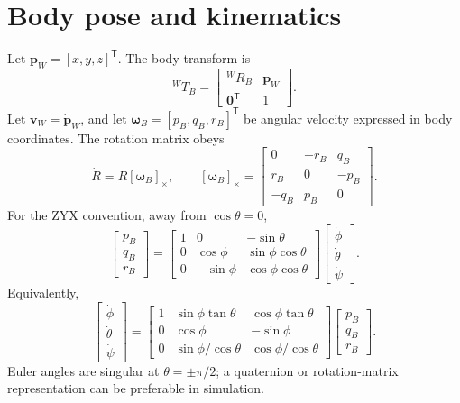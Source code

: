 \documentclass[11pt,a4paper]{article}
\newcommand{\skew}[1]{[#1]_\times}
\begin{document}
\section{Body pose and kinematics}
Let \(\mathbf p_W=[x,y,z]^{\mathsf T}\). The body transform is
\[
{}^WT_B=\begin{bmatrix}{}^WR_B&\mathbf p_W\\\mathbf0^{\mathsf T}&1\end{bmatrix}.
\]
Let \(\mathbf v_W=\dot{\mathbf p}_W\), and let \(\boldsymbol\omega_B=[p_B,q_B,r_B]^{\mathsf T}\) be angular velocity expressed in body coordinates. The rotation matrix obeys
\[
\dot R=R\skew{\boldsymbol\omega_B},\qquad
\skew{\boldsymbol\omega_B}=
\begin{bmatrix}0&-r_B&q_B\\r_B&0&-p_B\\-q_B&p_B&0\end{bmatrix}.
\]
For the ZYX convention, away from \(\cos\theta=0\),
\[
\begin{bmatrix}p_B\\q_B\\r_B\end{bmatrix}=
\begin{bmatrix}
1&0&-\sin\theta\\
0&\cos\phi&\sin\phi\cos\theta\\
0&-\sin\phi&\cos\phi\cos\theta
\end{bmatrix}
\begin{bmatrix}\dot\phi\\\dot\theta\\\dot\psi\end{bmatrix}.
\]
Equivalently,
\[
\begin{bmatrix}\dot\phi\\\dot\theta\\\dot\psi\end{bmatrix}=
\begin{bmatrix}
1&\sin\phi\tan\theta&\cos\phi\tan\theta\\
0&\cos\phi&-\sin\phi\\
0&\sin\phi/\cos\theta&\cos\phi/\cos\theta
\end{bmatrix}
\begin{bmatrix}p_B\\q_B\\r_B\end{bmatrix}.
\]
Euler angles are singular at \(\theta=\pm\pi/2\); a quaternion or rotation-matrix representation can be preferable in simulation.
\end{document}
